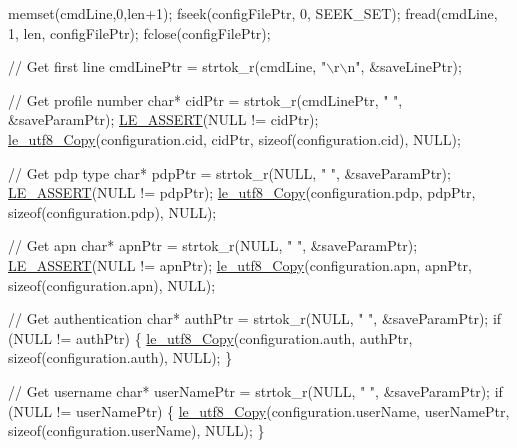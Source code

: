 \begin{DoxyCodeInclude}
{        memset(cmdLine,0,len+1);
        fseek(configFilePtr, 0, SEEK\_SET);
        fread(cmdLine, 1, len, configFilePtr);
        fclose(configFilePtr);

        \textcolor{comment}{// Get first line}
        cmdLinePtr = strtok\_r(cmdLine, \textcolor{stringliteral}{"\(\backslash\)r\(\backslash\)n"}, &saveLinePtr);

        \textcolor{comment}{// Get profile number}
        \textcolor{keywordtype}{char}* cidPtr =  strtok\_r(cmdLinePtr, \textcolor{stringliteral}{" "}, &saveParamPtr);
        \hyperlink{le__log_8h_ac0dbbef91dc0fed449d0092ff0557b39}{LE\_ASSERT}(NULL != cidPtr);
        \hyperlink{le__utf8_8h_aa5ae72c01396c106fdf3b4741ead7477}{le\_utf8\_Copy}(configuration.cid, cidPtr, \textcolor{keyword}{sizeof}(configuration.cid), NULL);

        \textcolor{comment}{// Get pdp type}
        \textcolor{keywordtype}{char}* pdpPtr = strtok\_r(NULL, \textcolor{stringliteral}{" "}, &saveParamPtr);
        \hyperlink{le__log_8h_ac0dbbef91dc0fed449d0092ff0557b39}{LE\_ASSERT}(NULL != pdpPtr);
        \hyperlink{le__utf8_8h_aa5ae72c01396c106fdf3b4741ead7477}{le\_utf8\_Copy}(configuration.pdp, pdpPtr, \textcolor{keyword}{sizeof}(configuration.pdp), NULL);

        \textcolor{comment}{// Get apn}
        \textcolor{keywordtype}{char}* apnPtr = strtok\_r(NULL, \textcolor{stringliteral}{" "}, &saveParamPtr);
        \hyperlink{le__log_8h_ac0dbbef91dc0fed449d0092ff0557b39}{LE\_ASSERT}(NULL != apnPtr);
        \hyperlink{le__utf8_8h_aa5ae72c01396c106fdf3b4741ead7477}{le\_utf8\_Copy}(configuration.apn, apnPtr, \textcolor{keyword}{sizeof}(configuration.apn), NULL);

        \textcolor{comment}{// Get authentication}
        \textcolor{keywordtype}{char}* authPtr = strtok\_r(NULL, \textcolor{stringliteral}{" "}, &saveParamPtr);
        \textcolor{keywordflow}{if} (NULL != authPtr)
        \{
            \hyperlink{le__utf8_8h_aa5ae72c01396c106fdf3b4741ead7477}{le\_utf8\_Copy}(configuration.auth, authPtr, \textcolor{keyword}{sizeof}(configuration.auth), NULL);
        \}

        \textcolor{comment}{// Get username}
        \textcolor{keywordtype}{char}* userNamePtr = strtok\_r(NULL, \textcolor{stringliteral}{" "}, &saveParamPtr);
        \textcolor{keywordflow}{if} (NULL != userNamePtr)
        \{
            \hyperlink{le__utf8_8h_aa5ae72c01396c106fdf3b4741ead7477}{le\_utf8\_Copy}(configuration.userName, userNamePtr, \textcolor{keyword}{sizeof}(configuration.userName), 
      NULL);
        \}

}
\end{DoxyCodeInclude}
